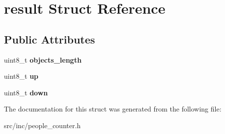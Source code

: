 \hypertarget{structresult}{}\section{result Struct Reference}
\label{structresult}
\subsection*{Public Attributes}
\begin{DoxyCompactItemize}
\item 
\mbox{\label{structresult_a49e51f324e37ef7001a2e59a3d046cdd}} 
uint8\+\_\+t {\bfseries objects\+\_\+length}
\item 
\mbox{\label{structresult_a394e6b9dd63568fda352f73eb956ed31}} 
uint8\+\_\+t {\bfseries up}
\item 
\mbox{\label{structresult_a3407dde8b5621d46c43f87b820c2a4ba}} 
uint8\+\_\+t {\bfseries down}
\end{DoxyCompactItemize}


The documentation for this struct was generated from the following file\+:\begin{DoxyCompactItemize}
\item 
src/inc/people\+\_\+counter.\+h\end{DoxyCompactItemize}
